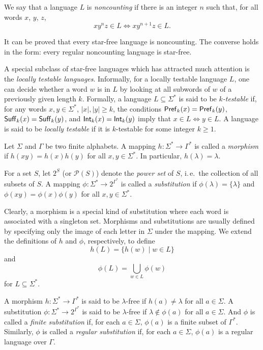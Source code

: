 We say that a language $L$ is \emph{noncounting} if there is an integer $n$ such that, for all words $x$, $y$, $z$,
$$x y^n z \in L \Leftrightarrow x y^{n+1} z \in L.$$

It can be proved that every star-free language is noncounting. The converse holds in the form: every regular noncounting language is star-free.

A special subclass of star-free languages which has attracted much attention is the \emph{locally testable languages}. Informally, for a locally testable language $L$, one can decide whether a word $w$ is in $L$ by looking at all subwords of $w$ of a previously given length $k$. Formally, a language $L \subseteq \Sigma^*$ is said to be \emph{$k$-testable} if, for any words $x, y \in \Sigma^*$, $|x|, |y| \ge k$, the conditions $\textup{\sf Pref\/}_k(x) = \textup{\sf Pref\/}_k(y)$, $\textup{\sf Suff\/}_k(x) = \textup{\sf Suff\/}_k(y)$, and $\textup{\sf Int\/}_k(x) = \textup{\sf Int\/}_k(y)$ imply that $x \in L \Leftrightarrow y \in L$. A language is said to be \emph{locally testable} if it is $k$-testable for some integer $k \ge 1$.

Let $\Sigma$ and $\Gamma$ be two finite alphabets. A mapping $h: \Sigma^* \to \Gamma^*$ is called a \emph{morphism} if $h(xy) = h(x) h(y)$ for all $x, y \in \Sigma^*$. In particular, $h(\lambda) = \lambda$.

For a set $S$, let $2^S$ (or $\mathcal{P}(S)$) denote the \emph{power set} of $S$, i.\,e.\ the collection of all subsets of $S$. A mapping $\phi: \Sigma^* \to 2^{\Gamma^*}$ is  called a \emph{substitution} if $\phi(\lambda) = \{\lambda\}$ and $\phi(xy) = \phi(x) \phi(y)$ for all $x, y \in \Sigma^*$.

Clearly, a morphism is a special kind of substitution where each word is associated with a singleton set. Morphisms and substitutions are usually defined by specifying only the image of each letter in $\Sigma$ under the mapping. We extend the definitions of $h$ and $\phi$, respectively, to define
$$h(L) = \{h(w) \mid w \in L\}$$
and
$$\phi(L) = \bigcup_{w \in L}\phi(w)$$
for $L \subseteq \Sigma^*$.

A morphism $h: \Sigma^* \to \Gamma^*$ is said to be $\lambda$-free if $h(a) \neq \lambda$ for all $a \in \Sigma$. A substitution $\phi: \Sigma^* \to 2^{\Gamma^*}$ is said to be $\lambda$-free if $\lambda \notin \phi(a)$ for all $a \in \Sigma$. And $\phi$ is called a  \emph{finite substitution} if, for each $a \in \Sigma$, $\phi(a)$ is a finite subset of $\Gamma^*$. Similarly, $\phi$ is called a  \emph{regular substitution} if, for each $a \in \Sigma$, $\phi(a)$ is a regular language over $\Gamma$.

